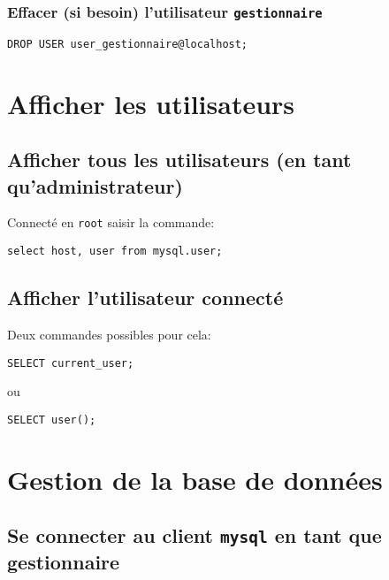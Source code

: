 \documentclass[11pt]{article}
\begin{document}
\subsubsection{Effacer (si besoin) l'utilisateur \texttt{gestionnaire}}
\label{sec:org591fd17}

\begin{verbatim}
DROP USER user_gestionnaire@localhost;
\end{verbatim}


\section{Afficher les utilisateurs}
\label{sec:org74c73bf}
\subsection{Afficher tous les utilisateurs (en tant qu'administrateur)}
\label{sec:org2237326}

Connecté en \texttt{root} saisir la commande:
\begin{verbatim}
select host, user from mysql.user;
\end{verbatim}

\subsection{Afficher l'utilisateur connecté}
\label{sec:orgb991ad4}

Deux commandes possibles pour cela:
\begin{verbatim}
SELECT current_user;
\end{verbatim}

ou 

\begin{verbatim}
SELECT user();
\end{verbatim}


\section{Gestion de la base de données}
\label{sec:orgfbb408c}

\subsection{Se connecter au client \texttt{mysql} en tant que gestionnaire}
\label{sec:orgfa648fc}
\end{document}
